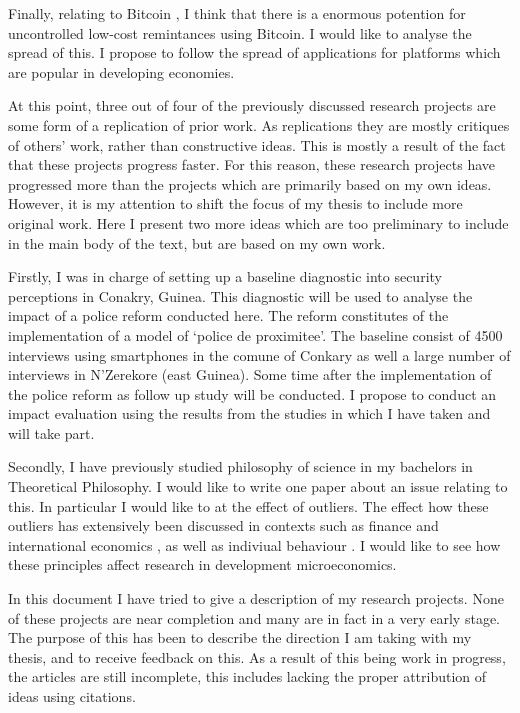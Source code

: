 \documentclass[a4paper]{report}\usepackage{graphicx, color}
\begin{document}
\begin{refsection}
Finally, relating to Bitcoin \parencite{nakamoto2008bitcoin}, I think that there is a enormous potention for uncontrolled low-cost remintances using Bitcoin. I would like to analyse the spread of this. I propose to follow the spread of applications for platforms which are popular in developing economies.

At this point, three out of four of the previously discussed research projects are some form of a replication of prior work. As replications they are mostly critiques of others' work, rather than constructive ideas. This is mostly a result of the fact that these projects progress faster. For this reason, these research projects have progressed more than the projects which are primarily based on my own ideas. However, it is my attention to shift the focus of my thesis to include more original work. Here I present two more ideas which are too preliminary to include in the main body of the text, but are based on my own work.

Firstly, I was in charge of setting up a baseline diagnostic into security perceptions in Conakry, Guinea. This diagnostic will be used to analyse the impact of a police reform conducted here. The reform constitutes of the implementation of a model of `police de proximitee'. The baseline consist of 4500 interviews using smartphones in the comune of Conkary as well a large number of interviews in N'Zerekore (east Guinea). Some time after the implementation of the police reform as follow up study will be conducted. I propose to conduct an impact evaluation using the results from the studies in which I have taken and will take part.

Secondly, I have previously studied philosophy of science in my bachelors in Theoretical Philosophy. I would like to write one paper about an issue relating to this. In particular I would like to at the effect of outliers. The effect how these outliers has extensively been discussed in contexts such as finance and international economics \parencite{taleb2010black,   sornette2009dragon},  as well as indiviual behaviour \parencite{kahneman2011thinking}. I would like to see how these principles affect research in development microeconomics.

In this document I have tried to give a description of my research projects. None of these projects are near completion and many are in fact in a very early stage. The purpose of this has been to describe the direction I am taking with my thesis, and to receive feedback on this. As a result of this being work in progress, the articles are still incomplete, this includes lacking the proper attribution of ideas using citations.

\printbibliography
\end{refsection}
\end{document}
